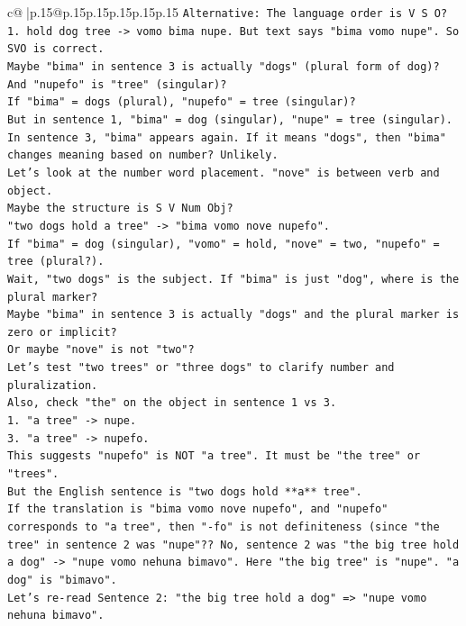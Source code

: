 \documentclass{article}
\begin{document}
{\begin{supertabular}{c@{$\;$}|p{.15\linewidth}@{}p{.15\linewidth}p{.15\linewidth}p{.15\linewidth}p{.15\linewidth}p{.15\linewidth}}
{{{\texttt{Alternative: The language order is V S O?} \\
\texttt{1. hold dog tree {-}> vomo bima nupe. But text says "bima vomo nupe". So SVO is correct.} \\
\texttt{Maybe "bima" in sentence 3 is actually "dogs" (plural form of dog)? And "nupefo" is "tree" (singular)?} \\
\texttt{If "bima" = dogs (plural), "nupefo" = tree (singular)?} \\
\texttt{But in sentence 1, "bima" = dog (singular), "nupe" = tree (singular).} \\
\texttt{In sentence 3, "bima" appears again. If it means "dogs", then "bima" changes meaning based on number? Unlikely.} \\
\texttt{Let's look at the number word placement. "nove" is between verb and object.} \\
\texttt{Maybe the structure is S V Num Obj?} \\
\texttt{"two dogs hold a tree" {-}> "bima vomo nove nupefo".} \\
\texttt{If "bima" = dog (singular), "vomo" = hold, "nove" = two, "nupefo" = tree (plural?).} \\
\texttt{Wait, "two dogs" is the subject. If "bima" is just "dog", where is the plural marker?} \\
\texttt{Maybe "bima" in sentence 3 is actually "dogs" and the plural marker is zero or implicit?} \\
\texttt{Or maybe "nove" is not "two"?} \\
\texttt{Let's test "two trees" or "three dogs" to clarify number and pluralization.} \\
\texttt{Also, check "the" on the object in sentence 1 vs 3.} \\
\texttt{1. "a tree" {-}> nupe.} \\
\texttt{3. "a tree" {-}> nupefo.} \\
\texttt{This suggests "nupefo" is NOT "a tree". It must be "the tree" or "trees".} \\
\texttt{But the English sentence is "two dogs hold **a** tree".} \\
\texttt{If the translation is "bima vomo nove nupefo", and "nupefo" corresponds to "a tree", then "{-}fo" is not definiteness (since "the tree" in sentence 2 was "nupe"?? No, sentence 2 was "the big tree hold a dog" {-}> "nupe vomo nehuna bimavo". Here "the big tree" is "nupe". "a dog" is "bimavo".} \\
\texttt{Let's re{-}read Sentence 2: "the big tree hold a dog" => "nupe vomo nehuna bimavo".} \\
}}}
\end{supertabular}}
\end{document}
